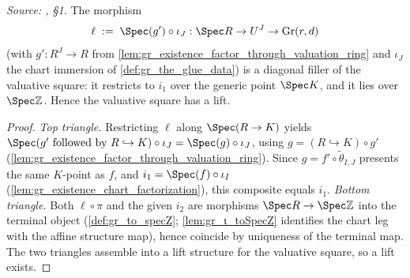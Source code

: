 \begin{lemma}\leanok
  \label{lem:gr_existence_lift}
  \textit{Source: \cite{nitsure-hilbert-quot}, \S 1.}
  The morphism
  \[
    \ell \;:=\; \Spec(g') \circ \iota_J : \Spec R \to U^J \to \mathrm{Gr}(r,d)
  \]
  (with \(g' : R^J \to R\) from
  \cref{lem:gr_existence_factor_through_valuation_ring} and \(\iota_J\) the chart
  immersion of \cref{def:gr_the_glue_data}) is a diagonal filler of the valuative
  square: it restricts to \(i_1\) over the generic point \(\Spec K\), and it lies
  over \(\Spec \mathbb{Z}\). Hence the valuative square has a lift.
\end{lemma}
\begin{proof}
    \leanok
  \emph{Top triangle.} Restricting \(\ell\) along \(\Spec(R \to K)\) yields
  \(\Spec(g' \text{ followed by } R \hookrightarrow K) \circ \iota_J = \Spec(g)
  \circ \iota_J\), using \(g = (R \hookrightarrow K)\circ g'\)
  (\cref{lem:gr_existence_factor_through_valuation_ring}). Since \(g = f' \circ
  \tilde\theta_{I,J}\) presents the same \(K\)-point as \(f\), and \(i_1 = \Spec(f)
  \circ \iota_I\) (\cref{lem:gr_existence_chart_factorization}), this composite
  equals \(i_1\). \emph{Bottom triangle.} Both \(\ell \circ \pi\) and the given
  \(i_2\) are morphisms \(\Spec R \to \Spec \mathbb{Z}\) into the terminal object
  (\cref{def:gr_to_specZ}; \cref{lem:gr_ι_toSpecZ} identifies the chart leg with the
  affine structure map), hence coincide by uniqueness of the terminal map. The two
  triangles assemble into a lift structure for the valuative square, so a lift
  exists.
\end{proof}

